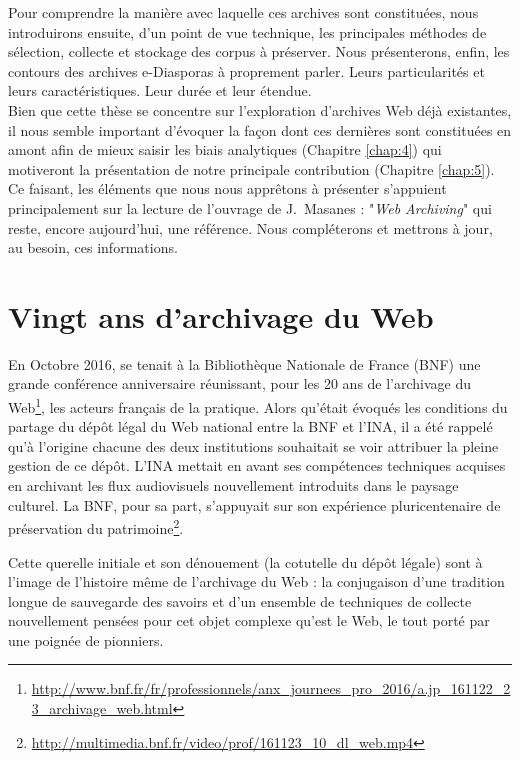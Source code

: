 \documentclass[symmetric,justified,marginals=raggedouter]{tufte-book}
\begin{document}
Pour comprendre la manière avec laquelle ces archives sont constituées, nous introduirons ensuite, d'un point de vue technique, les principales méthodes de sélection, collecte et stockage des corpus à préserver. Nous présenterons, enfin, les contours des archives e-Diaspo\-ras à proprement parler. Leurs particularités et leurs caractéristiques. Leur durée et leur étendue.\\

\noindent Bien que cette thèse se concentre sur l'exploration d'archives Web déjà existantes, il nous semble important d'évoquer la façon dont ces dernières sont constituées en amont afin de mieux saisir les biais analytiques (Chapitre \ref{chap:4}) qui motiveront la présentation de notre principale contribution (Chapitre \ref{chap:5}). Ce faisant, les éléments que nous nous apprêtons à présenter s'appuient principalement sur la lecture de l'ouvrage de J.~Masanes : "\textit{Web Archiving}" \citep{masanes_web_2006} qui reste, encore aujourd'hui, une référence. Nous compléterons et mettrons à jour, au besoin, ces informations.

\section{Vingt ans d'archivage du Web}
\label{sec:3_20ans}

\noindent En Octobre 2016, se tenait à la Bibliothèque Nationale de France (BNF) une grande conférence anniversaire réunissant, pour les 20 ans de l'archivage du Web\footnote{\url{http://www.bnf.fr/fr/professionnels/anx_journees_pro_2016/a.jp_161122_23_archivage_web.html}}, les acteurs français de la pratique. Alors qu'était évoqués les conditions du partage du dépôt légal du Web national entre la BNF et l'INA, il a été rappelé qu'à l'origine chacune des deux institutions souhaitait se voir attribuer la pleine gestion de ce dépôt. L'INA mettait en avant ses compétences techniques acquises en archivant les flux audiovisuels nouvellement introduits dans le paysage culturel. La BNF, pour sa part, s'appuyait sur son expérience pluricentenaire de préservation du patrimoine\footnote{\url{http://multimedia.bnf.fr/video/prof/161123_10_dl_web.mp4}}. 

Cette querelle initiale et son dénouement (la cotutelle du dépôt légale) sont à l'image de l'histoire même de l'archivage du Web : la conjugaison d'une tradition longue de sauvegarde des savoirs et d'un ensemble de techniques de collecte nouvellement pensées pour cet objet complexe qu'est le Web, le tout porté par une poignée de pionniers.
\end{document}
